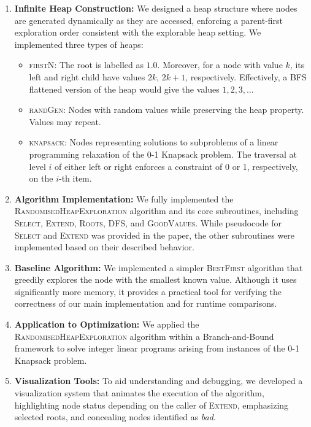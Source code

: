 \documentclass[conference]{IEEEtran}
\begin{document}
\begin{enumerate}
    \item \textbf{Infinite Heap Construction:} We designed a heap structure where nodes are generated dynamically as they are accessed, enforcing a parent-first exploration order consistent with the explorable heap setting. We implemented three types of heaps:
    \begin{itemize}
        \item \textsc{firstN}: The root is labelled as $1.0$. Moreover, for a node with value $k$, its left and right child have values $2k$, $2k+1$, respectively. Effectively, a BFS flattened version of the heap would give the values $1, 2, 3, \ldots$
        \item \textsc{randGen}: Nodes with random values while preserving the heap property. Values may repeat.
        \item \textsc{knapsack}: Nodes representing solutions to subproblems of a linear programming relaxation of the 0-1 Knapsack problem. The traversal at level $i$ of either left or right enforces a constraint of 0 or 1, respectively, on the $i$-th item.
    \end{itemize}
    
    \item \textbf{Algorithm Implementation:} We fully implemented the \textsc{RandomisedHeapExploration} algorithm and its core subroutines, including \textsc{Select}, \textsc{Extend}, \textsc{Roots}, \textsc{DFS}, and \textsc{GoodValues}. While pseudocode for \textsc{Select} and \textsc{Extend} was provided in the paper, the other subroutines were implemented based on their described behavior.
    
    \item \textbf{Baseline Algorithm:} We implemented a simpler \textsc{BestFirst} algorithm that greedily explores the node with the smallest known value. Although it uses significantly more memory, it provides a practical tool for verifying the correctness of our main implementation and for runtime comparisons.
    
    \item \textbf{Application to Optimization:} We applied the \textsc{RandomisedHeapExploration} algorithm within a Branch-and-Bound framework to solve integer linear programs arising from instances of the 0-1 Knapsack problem.
    
    \item \textbf{Visualization Tools:} To aid understanding and debugging, we developed a visualization system that animates the execution of the algorithm, highlighting node status depending on the caller of \textsc{Extend}, emphasizing selected roots, and concealing nodes identified as \textit{bad}.
\end{enumerate}
\end{document}
